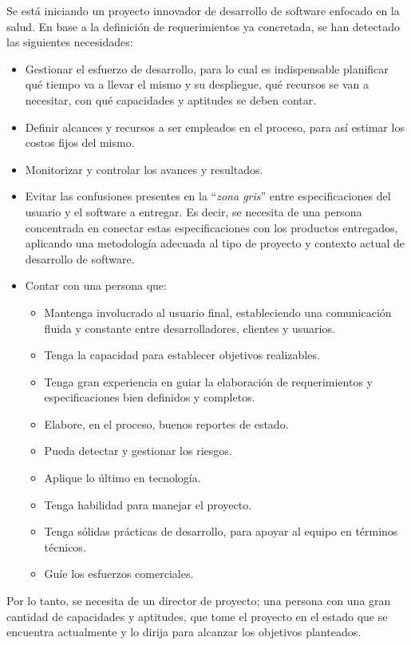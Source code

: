 Se está iniciando un proyecto innovador de desarrollo de software enfocado en la salud.
En base a la definición de requerimientos ya concretada, se han detectado las siguientes necesidades: 
	\begin{itemize}
		\item Gestionar el esfuerzo de desarrollo, para lo cual es indispensable planificar qué tiempo va a llevar el mismo y su despliegue, qué recursos se van a necesitar, con qué capacidades y aptitudes se deben contar.
        \item Definir alcances y recursos a ser empleados en el proceso, para así estimar los costos fijos del mismo. 
        \item Monitorizar y controlar los avances y resultados.
        \item Evitar las confusiones presentes en la ``\textit{zona gris}'' entre especificaciones del usuario y el software a entregar.
        Es decir, se necesita de una persona concentrada en conectar estas especificaciones con los productos entregados, aplicando una metodología adecuada al tipo de proyecto y contexto actual de desarrollo de software.
        \item Contar con una persona que:
        \begin{itemize}
            \item Mantenga involucrado al usuario final, estableciendo una comunicación fluida y constante entre desarrolladores, clientes y usuarios.
            \item Tenga la capacidad para establecer objetivos realizables.
            \item Tenga gran experiencia en guiar la elaboración de requerimientos y especificaciones bien definidos y completos.
            \item Elabore, en el proceso, buenos reportes de estado.
            \item Pueda detectar y gestionar los riesgos.
            \item Aplique lo último en tecnología.
            \item Tenga habilidad para manejar el proyecto.
            \item Tenga sólidas prácticas de desarrollo, para apoyar al equipo en términos técnicos.
            \item Guíe los esfuerzos comerciales.
        \end{itemize}
	\end{itemize}
Por lo tanto, se necesita de un director de proyecto; una persona con una gran cantidad de capacidades y aptitudes, que tome el proyecto en el estado que se encuentra actualmente y lo dirija para alcanzar los objetivos planteados.


